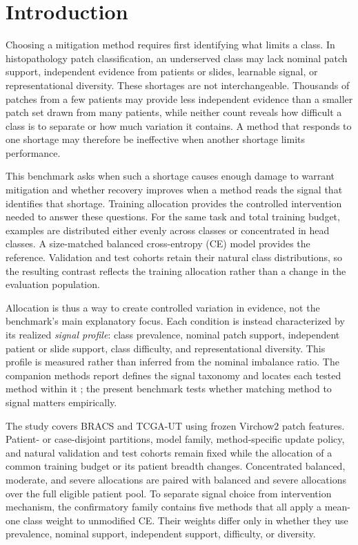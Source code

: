 \documentclass[11pt]{article}
\begin{document}
\setcounter{tocdepth}{2}
\tableofcontents
\clearpage

\section{Introduction}
Choosing a mitigation method requires first identifying what limits a class. In histopathology patch classification, an underserved class may lack nominal patch support, independent evidence from patients or slides, learnable signal, or representational diversity. These shortages are not interchangeable. Thousands of patches from a few patients may provide less independent evidence than a smaller patch set drawn from many patients, while neither count reveals how difficult a class is to separate or how much variation it contains. A method that responds to one shortage may therefore be ineffective when another shortage limits performance.

This benchmark asks when such a shortage causes enough damage to warrant mitigation and whether recovery improves when a method reads the signal that identifies that shortage. Training allocation provides the controlled intervention needed to answer these questions. For the same task and total training budget, examples are distributed either evenly across classes or concentrated in head classes. A size-matched balanced cross-entropy (CE) model provides the reference. Validation and test cohorts retain their natural class distributions, so the resulting contrast reflects the training allocation rather than a change in the evaluation population.

Allocation is thus a way to create controlled variation in evidence, not the benchmark's main explanatory focus. Each condition is instead characterized by its realized \emph{signal profile}: class prevalence, nominal patch support, independent patient or slide support, class difficulty, and representational diversity. This profile is measured rather than inferred from the nominal imbalance ratio. The companion methods report defines the signal taxonomy and locates each tested method within it \citep{queisler2026imbalanceMethods}; the present benchmark tests whether matching method to signal matters empirically.

The study covers BRACS and TCGA-UT using frozen Virchow2 patch features. Patient- or case-disjoint partitions, model family, method-specific update policy, and natural validation and test cohorts remain fixed while the allocation of a common training budget or its patient breadth changes. Concentrated balanced, moderate, and severe allocations are paired with balanced and severe allocations over the full eligible patient pool. To separate signal choice from intervention mechanism, the confirmatory family contains five methods that all apply a mean-one class weight to unmodified CE. Their weights differ only in whether they use prevalence, nominal support, independent support, difficulty, or diversity.
\end{document}
